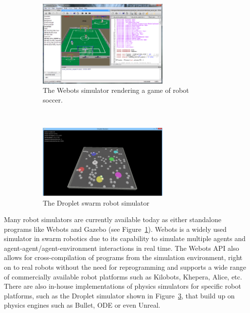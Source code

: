 \documentclass[Main.tex]{subfiles}
\begin{document}
\begin{figure}[!ht]
\begin{subfigure}{.5\textwidth}
\centering\includegraphics[width=6.5cm]{assets/Webots.png}
\centering\caption{The Webots simulator rendering a game of robot soccer.\footnotemark}\label{fig:gazebo}
\end{subfigure}~
\begin{subfigure}{.5\textwidth}
\centering\includegraphics[width=6.5cm]{assets/dsim.png}
\centering\caption{The Droplet swarm robot simulator}\label{fig:dropletsim}
\end{subfigure}
\caption{}
\end{figure}

Many robot simulators are currently available today as either standalone programs like Webots and Gazebo (see Figure~\ref{fig:gazebo}).%
Webots is a widely used simulator in swarm robotics due to its capability to simulate multiple agents and agent-agent/agent-environment interactions in real time. The Webots API also allows for cross-compilation of programs from the simulation environment, right on to real robots without the need for reprogramming and supports a wide range of commercially available robot platforms such as Kilobots, Khepera, Alice, etc. There are also in-house implementations of physics simulators for specific robot platforms, such as the Droplet simulator shown in Figure~\ref{fig:dropletsim}, that build up on physics engines such as Bullet, ODE or even Unreal. 
\end{document}
